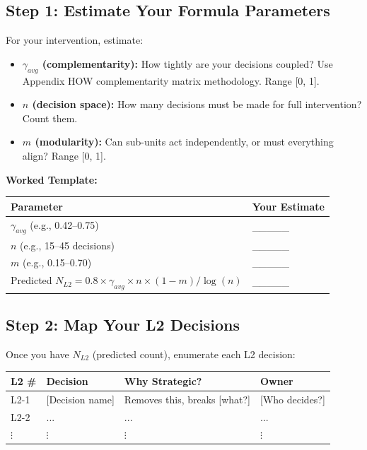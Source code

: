 \documentclass[11pt, a4paper]{article}
\begin{document}
\subsection{Step 1: Estimate Your Formula Parameters} \label{sec:ch15-part3a}

For your intervention, estimate:

\begin{itemize}[nosep]
    \item \textbf{$\gamma_{avg}$ (complementarity):} How tightly are your decisions coupled? Use Appendix HOW complementarity matrix methodology. Range [0, 1].

    \item \textbf{$n$ (decision space):} How many decisions must be made for full intervention? Count them.

    \item \textbf{$m$ (modularity):} Can sub-units act independently, or must everything align? Range [0, 1].
\end{itemize}

\textbf{Worked Template:}

\begin{center}
\begin{tabular}{|l|l|}
\hline
\textbf{Parameter} & \textbf{Your Estimate} \\
\hline
$\gamma_{avg}$ (e.g., 0.42--0.75) & \_\_\_\_\_ \\
\hline
$n$ (e.g., 15--45 decisions) & \_\_\_\_\_ \\
\hline
$m$ (e.g., 0.15--0.70) & \_\_\_\_\_ \\
\hline
Predicted $N_{L2} = 0.8 \times \gamma_{avg} \times n \times (1-m) / \log(n)$ & \_\_\_\_\_ \\
\hline
\end{tabular}
\end{center}

\subsection{Step 2: Map Your L2 Decisions} \label{sec:ch15-part3b}

Once you have $N_{L2}$ (predicted count), enumerate each L2 decision:

\begin{center}
\begin{tabular}{|l|l|l|l|}
\hline
\textbf{L2 \#} & \textbf{Decision} & \textbf{Why Strategic?} & \textbf{Owner} \\
\hline
L2-1 & [Decision name] & Removes this, breaks [what?] & [Who decides?] \\
\hline
L2-2 & ... & ... & ... \\
\hline
$\vdots$ & $\vdots$ & $\vdots$ & $\vdots$ \\
\hline
\end{tabular}
\end{center}
\end{document}
